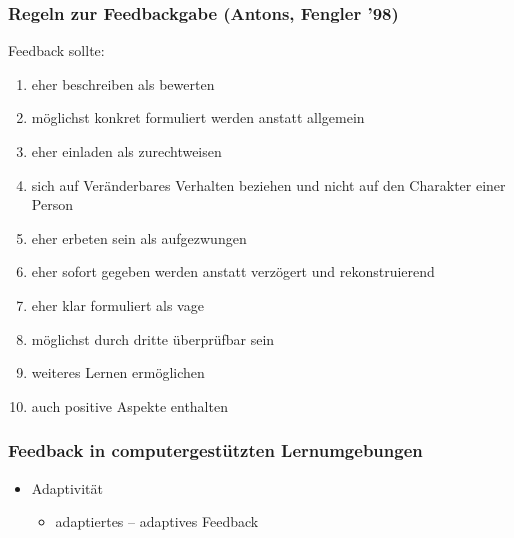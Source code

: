 \begin{frame}[<+->]
	\frametitle{Regeln zur Feedbackgabe  \small(Antons, Fengler '98)}
	Feedback sollte:
	\begin{enumerate}
		\item eher beschreiben als bewerten
		\item möglichst konkret formuliert werden anstatt allgemein
		\item eher einladen als zurechtweisen
		\item sich auf Veränderbares Verhalten beziehen und nicht auf den Charakter einer Person
		\item eher erbeten sein als aufgezwungen
		\item eher sofort gegeben werden anstatt verzögert und rekonstruierend
		\item eher klar formuliert als vage
		\item möglichst durch dritte überprüfbar sein
		\item weiteres Lernen ermöglichen
		\item auch positive Aspekte enthalten
	\end{enumerate}
\end{frame}

\begin{frame}[<+->]
	\frametitle{Feedback in computergestützten Lernumgebungen}
	\begin{itemize}
		\item Adaptivität
		\begin{itemize}
			\item adaptiertes – adaptives Feedback
		\end{itemize}
	\end{itemize}
\end{frame}

